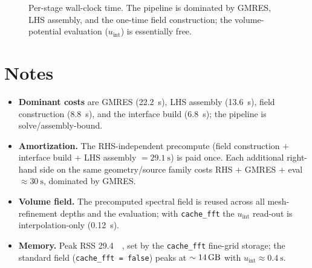 \documentclass[11pt]{article}
\begin{document}
\begin{figure}[h]
\centering
{}
\caption{Per-stage wall-clock time. The pipeline is dominated by GMRES,
LHS assembly, and the one-time field construction; the volume-potential
evaluation ($u_{\mathrm{int}}$) is essentially free.}
\end{figure}

\section{Notes}

\begin{itemize}
\item \textbf{Dominant costs} are GMRES (\SI{22.2}{\second}), LHS assembly
      (\SI{13.6}{\second}), field construction (\SI{8.8}{\second}), and the
      interface build (\SI{6.8}{\second}); the pipeline is solve/assembly-bound.
\item \textbf{Amortization.} The RHS-independent precompute (field
      construction $+$ interface build $+$ LHS assembly $=\SI{29.1}{\second}$)
      is paid once. Each additional right-hand side on the same
      geometry/source family costs RHS $+$ GMRES $+$ eval $\approx
      \SI{30}{\second}$, dominated by GMRES.
\item \textbf{Volume field.} The precomputed spectral field is reused across
      all mesh-refinement depths and the evaluation; with \texttt{cache\_fft}
      the $u_{\mathrm{int}}$ read-out is interpolation-only
      (\SI{0.12}{\second}).
\item \textbf{Memory.} Peak RSS \SI{29.4}{\giga\byte}, set by the
      \texttt{cache\_fft} fine-grid storage; the standard field
      (\texttt{cache\_fft = false}) peaks at $\sim\SI{14}{\giga\byte}$ with
      $u_{\mathrm{int}}\approx\SI{0.4}{\second}$.
\end{itemize}
\end{document}
